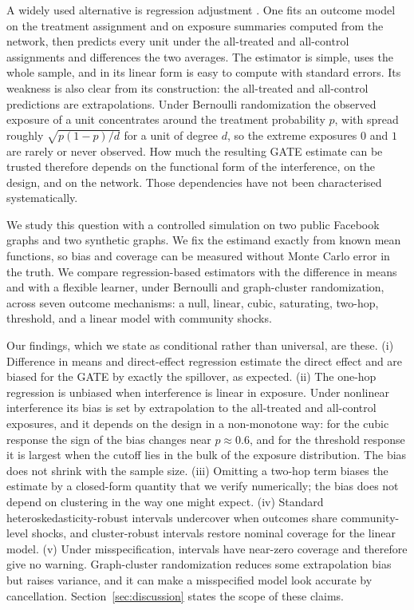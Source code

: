 \documentclass{article}
\begin{document}
A widely used alternative is regression adjustment \citep{chin2019}. One fits an outcome model on the treatment assignment and on exposure summaries computed from the network, then predicts every unit under the all-treated and all-control assignments and differences the two averages. The estimator is simple, uses the whole sample, and in its linear form is easy to compute with standard errors. Its weakness is also clear from its construction: the all-treated and all-control predictions are extrapolations. Under Bernoulli randomization the observed exposure of a unit concentrates around the treatment probability $p$, with spread roughly $\sqrt{p(1-p)/d}$ for a unit of degree $d$, so the extreme exposures $0$ and $1$ are rarely or never observed. How much the resulting GATE estimate can be trusted therefore depends on the functional form of the interference, on the design, and on the network. Those dependencies have not been characterised systematically.

We study this question with a controlled simulation on two public Facebook graphs and two synthetic graphs. We fix the estimand exactly from known mean functions, so bias and coverage can be measured without Monte Carlo error in the truth. We compare regression-based estimators with the difference in means and with a flexible learner, under Bernoulli and graph-cluster randomization, across seven outcome mechanisms: a null, linear, cubic, saturating, two-hop, threshold, and a linear model with community shocks.

Our findings, which we state as conditional rather than universal, are these. (i) Difference in means and direct-effect regression estimate the direct effect and are biased for the GATE by exactly the spillover, as expected. (ii) The one-hop regression is unbiased when interference is linear in exposure. Under nonlinear interference its bias is set by extrapolation to the all-treated and all-control exposures, and it depends on the design in a non-monotone way: for the cubic response the sign of the bias changes near $p\approx 0.6$, and for the threshold response it is largest when the cutoff lies in the bulk of the exposure distribution. The bias does not shrink with the sample size. (iii) Omitting a two-hop term biases the estimate by a closed-form quantity that we verify numerically; the bias does not depend on clustering in the way one might expect. (iv) Standard heteroskedasticity-robust intervals undercover when outcomes share community-level shocks, and cluster-robust intervals restore nominal coverage for the linear model. (v) Under misspecification, intervals have near-zero coverage and therefore give no warning. Graph-cluster randomization reduces some extrapolation bias but raises variance, and it can make a misspecified model look accurate by cancellation. Section~\ref{sec:discussion} states the scope of these claims.
\end{document}
